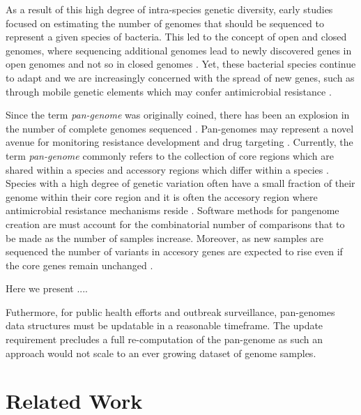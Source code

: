 \documentclass{article}
\begin{document}
As a result of this high degree of intra-species genetic diversity, early studies \cite{tettelin2005genome, tettelin2008comparative} focused on estimating the number of genomes that should be sequenced to represent a given species of bacteria.
This led to the concept of open and closed genomes, where sequencing additional genomes lead to newly discovered genes in open genomes and not so in closed genomes \cite{tettelin2008comparative}.
Yet, these bacterial species continue to adapt and we are increasingly concerned with the spread of new genes, such as through mobile genetic elements which may confer antimicrobial resistance \cite{harbottle2006genetics}.

Since the term \textit{pan-genome} was originally coined, there has been an explosion in the number of complete genomes sequenced \cite{vernikos2015ten}.
Pan-genomes may represent a novel avenue for monitoring resistance development \cite{tettelin2005genome} and drug targeting \cite{muzzi2007pan}.
Currently, the term \textit{pan-genome} commonly refers to the collection of core regions which are shared within a species and accessory regions which differ within a species \cite{tettelin2005genome, vernikos2015ten}.
Species with a high degree of genetic variation often have a small fraction of their genome within their core region \cite{rouli2015bacterial} and it is often the accesory region where antimicrobial resistance mechanisms reside \cite{muzzi2007pan}.
Software methods for pangenome creation are must account for the combinatorial number of comparisons that to be made as the number of samples increase.
Moreover, as new samples are sequenced the number of variants in accesory genes are expected to rise even if the core genes remain unchanged \cite{medini2005microbial}.

Here we present ....

Futhermore, for public health efforts and outbreak surveillance, pan-genomes data structures must be updatable in a reasonable timeframe.
The update requirement precludes a full re-computation of the pan-genome as such an approach would not scale to an ever growing dataset of genome samples.

\enlargethispage{-65.1pt}

\section{Related Work}
\end{document}
